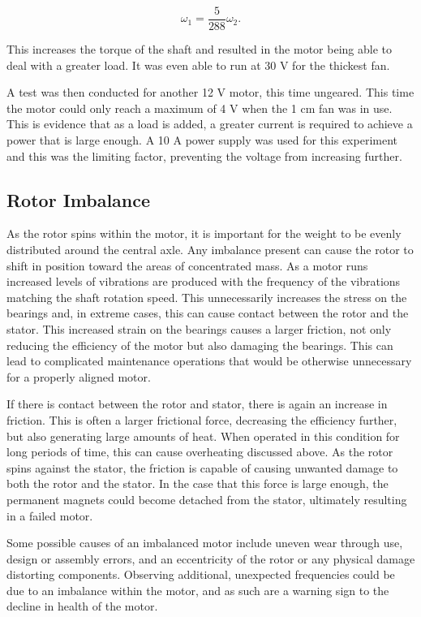 \begin{equation}
\omega_1 = \frac{5}{288} \omega_2.
\label{eq:gear_Ratio}
\end{equation}

This increases the torque of the shaft and resulted in the motor being able to deal with a greater load. It was even able to run at 30 V for the thickest fan.

A test was then conducted for another 12 V motor, this time ungeared. This time the motor could only reach a maximum of 4 V when the 1 cm fan was in use. This is evidence that as a load is added, a greater current is required to achieve a power that is large enough. A 10 A power supply was used for this experiment and this was the limiting factor, preventing the voltage from increasing further.

\subsection{Rotor Imbalance}
As the rotor spins within the motor, it is important for the weight to be evenly distributed around the central axle. Any imbalance present can cause the rotor to shift in position toward the areas of concentrated mass. As a motor runs increased levels of vibrations are produced with the frequency of the vibrations matching the shaft rotation speed. This unnecessarily increases the stress on the bearings and, in extreme cases, this can cause contact between the rotor and the stator. This increased strain on the bearings causes a larger friction, not only reducing the efficiency of the motor but also damaging the bearings. This can lead to complicated maintenance operations that would be otherwise unnecessary for a properly aligned motor.

If there is contact between the rotor and stator, there is again an increase in friction. This is often a larger frictional force, decreasing the efficiency further, but also generating large amounts of heat. When operated in this condition for long periods of time, this can cause overheating discussed above. As the rotor spins against the stator, the friction is capable of causing unwanted damage to both the rotor and the stator. In the case that this force is large enough, the permanent magnets could become detached from the stator, ultimately resulting in a failed motor.

Some possible causes of an imbalanced motor include uneven wear through use, design or assembly errors, and an eccentricity of the rotor or any physical damage distorting components. Observing additional, unexpected frequencies could be due to an imbalance within the motor, and as such are a warning sign to the decline in health of the motor. 

